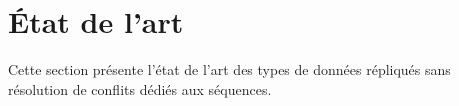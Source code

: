 
\chapter{État de l'art}

Cette section présente l'état de l'art des types de données répliqués sans
résolution de conflits dédiés aux séquences.